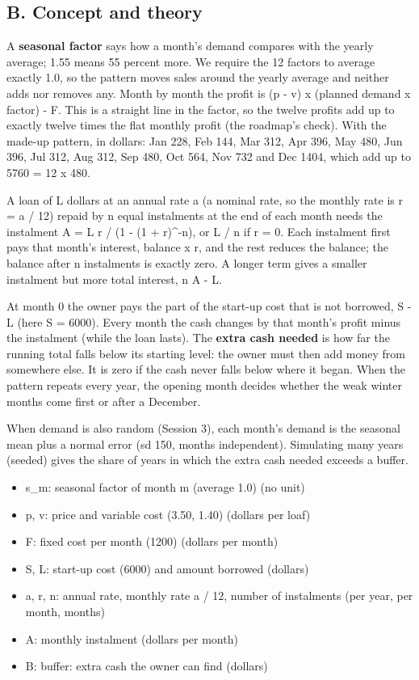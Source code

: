 \documentclass[11pt,a4paper]{article}
\begin{document}
\subsection*{B. Concept and theory}
A \textbf{seasonal factor} says how a month's demand compares with the yearly average; 1.55 means 55 percent more. We require the 12 factors to average exactly 1.0, so the pattern moves sales around the yearly average and neither adds nor removes any. Month by month the profit is (p - v) x (planned demand x factor) - F. This is a straight line in the factor, so the twelve profits add up to exactly twelve times the flat monthly profit (the roadmap's check). With the made-up pattern, in dollars: Jan 228, Feb 144, Mar 312, Apr 396, May 480, Jun 396, Jul 312, Aug 312, Sep 480, Oct 564, Nov 732 and Dec 1404, which add up to 5760 = 12 x 480.

A loan of L dollars at an annual rate a (a nominal rate, so the monthly rate is r = a / 12) repaid by n equal instalments at the end of each month needs the instalment A = L r / (1 - (1 + r)\textasciicircum{}-n), or L / n if r = 0. Each instalment first pays that month's interest, balance x r, and the rest reduces the balance; the balance after n instalments is exactly zero. A longer term gives a smaller instalment but more total interest, n A - L.

At month 0 the owner pays the part of the start-up cost that is not borrowed, S - L (here S = 6000). Every month the cash changes by that month's profit minus the instalment (while the loan lasts). The \textbf{extra cash needed} is how far the running total falls below its starting level: the owner must then add money from somewhere else. It is zero if the cash never falls below where it began. When the pattern repeats every year, the opening month decides whether the weak winter months come first or after a December.

When demand is also random (Session 3), each month's demand is the seasonal mean plus a normal error (sd 150, months independent). Simulating many years (seeded) gives the share of years in which the extra cash needed exceeds a buffer.

\begin{itemize}[nosep]
\item s\_m: seasonal factor of month m (average 1.0) (no unit)
\item p, v: price and variable cost (3.50, 1.40) (dollars per loaf)
\item F: fixed cost per month (1200) (dollars per month)
\item S, L: start-up cost (6000) and amount borrowed (dollars)
\item a, r, n: annual rate, monthly rate a / 12, number of instalments (per year, per month, months)
\item A: monthly instalment (dollars per month)
\item B: buffer: extra cash the owner can find (dollars)
\end{itemize}
\end{document}
